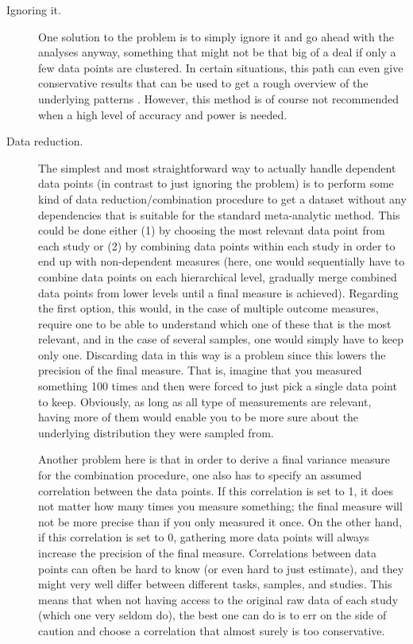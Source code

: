 \begin{description} \item [Ignoring it.] One solution to the problem is to simply ignore it and go ahead with the analyses anyway, something that might not be that big of a deal if only a few data points are clustered. In certain situations, this path can even give conservative results that can be used to get a rough overview of the underlying patterns \parencite{Hedges2010}. However, this method is of course not recommended when a high level of accuracy and power is needed.

\item [Data reduction.] The simplest and most straightforward way to actually handle dependent data points (in contrast to just ignoring the problem) is to perform some kind of data reduction/combination procedure to get a dataset without any dependencies that is suitable for the standard meta-analytic method. This could be done either (1) by choosing the most relevant data point from each study or (2) by combining data points within each study in order to end up with non-dependent measures (here, one would sequentially have to combine data points on each hierarchical level, gradually merge combined data points from lower levels until a final measure is achieved). Regarding the first option, this would, in the case of multiple outcome measures, require one to be able to understand which one of these that is the most relevant, and in the case of several samples, one would simply have to keep only one. Discarding data in this way is a problem since this lowers the precision of the final measure. That is, imagine that you measured something 100 times and then were forced to just pick a single data point to keep. Obviously, as long as all type of measurements are relevant, having more of them would enable you to be more sure about the underlying distribution they were sampled from.

Another problem here is that in order to derive a final variance measure for the combination procedure, one also has to specify an assumed correlation between the data points. If this correlation is set to 1, it does not matter how many times you measure something; the final measure will not be more precise than if you only measured it once. On the other hand, if this correlation is set to 0, gathering more data points will always increase the precision of the final measure. Correlations between data points can often be hard to know (or even hard to just estimate), and they might very well differ between different tasks, samples, and studies. This means that when not having access to the original raw data of each study (which one very seldom do), the best one can do is to err on the side of caution and choose a correlation that almost surely is too conservative.


\end{description}
